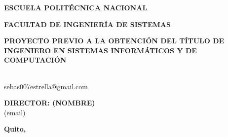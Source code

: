 \begin{titlepage}
\begin{center}
{\huge\bf\MakeUppercase{Escuela Politécnica Nacional}}
\vfill

{\Large\bf\MakeUppercase{Facultad de Ingeniería de Sistemas}}
\vfill

{\large\bf\MakeUppercase\thetitle}
\vfill

{\bf\MakeUppercase{Proyecto Previo a la Obtención del Título de Ingeniero
en Sistemas Informáticos y de Computación}}
\vfill

{\bf\MakeUppercase\theauthor} \\
sebas007estrella@gmail.com
\vfill

{\bf\MakeUppercase{Director: (nombre)}} \\
(email)
\vfill

{\bf{Quito, \thedate}}
\vfill
\end{center}
\end{titlepage}
